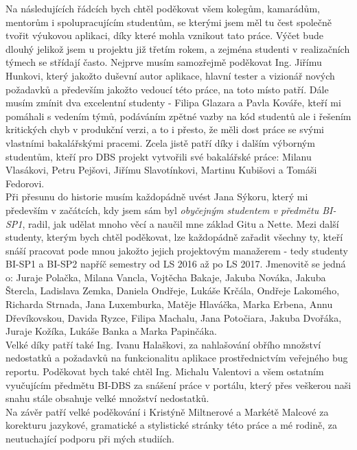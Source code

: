 Na následujících řádcích bych chtěl poděkovat všem kolegům, kamarádům, mentorům i spolupracujícím studentům, se kterými jsem měl tu čest společně tvořit výukovou aplikaci, díky které mohla vznikout tato práce. Výčet bude dlouhý jelikož jsem u projektu již třetím rokem, a zejména studenti v realizačních týmech se střídají často. Nejprve musím samozřejmě poděkovat Ing. Jiřímu Hunkovi, který jakožto duševní autor aplikace, hlavní tester a vizionář nových požadavků a především jakožto vedoucí této práce, na toto místo patří. Dále musím zmínit dva excelentní studenty - Filipa Glazara a Pavla Kováře, kteří mi pomáhali s vedením týmů, podáváním zpětné vazby na kód studentů ale i řešením kritických chyb v produkční verzi, a to i přesto, že měli dost práce se svými vlastními bakalářskými pracemi. Zcela jistě patří díky i dalším výborným studentům, kteří pro DBS projekt vytvořili své bakalářské práce: Milanu Vlasákovi, Petru Pejšovi, Jiřímu Slavotínkovi, Martinu Kubišovi a Tomáši Fedorovi.\\
Při přesunu do historie musím každopádně uvést Jana Sýkoru, který mi především v začátcích, kdy jsem sám byl \emph{obyčejným studentem v předmětu BI-SP1}, radil, jak udělat mnoho věcí a naučil mne základ Gitu a Nette. Mezi další studenty, kterým bych chtěl poděkovat, lze každopádně zařadit všechny ty, kteří snáší pracovat pode mnou jakožto jejich projektovým manažerem - tedy studenty BI-SP1 a BI-SP2 napříč semestry od LS 2016 až po LS 2017. Jmenovitě se jedná o: Juraje Polačka, Milana Vancla, Vojtěcha Bakaje, Jakuba Nováka, Jakuba Štercla, Ladislava Zemka, Daniela Ondřeje, Lukáše Krčála, Ondřeje Lakomého, Richarda Strnada, Jana Luxemburka, Matěje Hlaváčka, Marka Erbena, Annu Dřevíkovskou, Davida Ryzce, Filipa Machalu, Jana Potočiara, Jakuba Dvořáka, Juraje Kožíka, Lukáše Banka a Marka Papinčáka.\\
Velké díky patří také Ing. Ivanu Halaškovi, za nahlašování obřího množství nedostatků a požadavků na funkcionalitu aplikace prostřednictvím veřejného bug reportu. Poděkovat bych také chtěl Ing. Michalu Valentovi a všem ostatním vyučujícím předmětu BI-DBS za snášení práce v portálu, který přes veškerou naši snahu stále obsahuje velké množství nedostatků.\\
Na závěr patří velké poděkování i Kristýně Miltnerové a Markétě Malcové za korekturu jazykové, gramatické a stylistické stránky této práce a mé rodině, za neutuchající podporu při mých studiích.